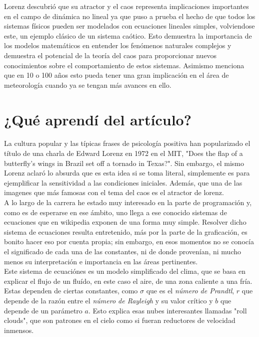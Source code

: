 Lorenz descubrió que su atractor y el caos representa implicaciones importantes en el campo de dinámica no lineal ya que puso a prueba el hecho de que todos los sistemas físicos pueden ser modelados con ecuaciones lineales simples, volviendose este, un ejemplo clásico de un sistema caótico. Esto demuestra la importancia de los modelos matemáticos en entender los fenómenos naturales complejos y demuestra el potencial de la teoría del caos para proporcionar nuevos conocimientos sobre el comportamiento de estos sistemas. Asimismo menciona que en 10 o 100 años esto pueda tener una gran implicación en el área de meteorología cuando ya se tengan más avances en ello.







\section*{¿Qué aprendí del artículo?}

La cultura popular y las típicas frases de psicología positiva han popularizado el título de una charla de Edward Lorenz en 1972 en el MIT, "Does the flap of a butterfly's wings in Brazil set off a tornado in Texas?". Sin embargo, el mismo Lorenz aclaró lo absurda que es esta idea si se toma literal, simplemente es para ejemplificar la sensitividad a las condiciones iniciales. Además, que una de las imagenes que más famosas con el tema del caos es el atractor de lorenz.\\

A lo largo de la carrera he estado muy interesado en la parte de programación y, como es de esperarse en ese ámbito, uno llega a ese conocido sistemas de ecuaciones que en wikipedia exponen de una forma muy simple. Resolver dicho sistema de ecuaciones resulta entretenido, más por la parte de la graficación, es bonito hacer eso por cuenta propia; sin embargo, en esos momentos no se conocía el significado de cada una de las constantes, ni de donde provenían, ni mucho menos su interpretación e importancia en las áreas pertinentes. \\

Este sistema de ecuaciónes es un modelo simplificado del clima, que se basa en explicar el flujo de un fluído, en este caso el aire, de una zona caliente a una fría. Estas dependen de ciertas constantes, como $\sigma$ que es el \textit{número de Prandtl}, $r$ que depende de la razón entre el \textit{número de Rayleigh} y su valor crítico y $b$ que depende de un parámetro $a$. Esto explica esas nubes interesantes llamadas "roll clouds", que son patrones en el cielo como si fueran reductores de velocidad inmensos. \\

